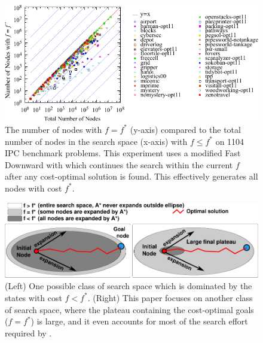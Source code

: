 
\begin{figure}[htbp]
  \centering
  \includegraphics[width=\linewidth]{tables/aaai16-frontier/aaai16prelim3/lmcut_frontier_noh-front.pdf}
 \caption{
 The number of nodes with $f=f^*$ (y-axis) compared to the
 total number of nodes in the search space (x-axis) with $f\leq f^*$ on 1104 IPC benchmark problems.
 This experiment uses a modified Fast Downward with \lmcut which 
 continues the search within the current $f$ after any cost-optimal solution is found.
 This effectively generates all nodes with cost $f^*$.
  }
 \label{fig:plateau-noh}
\end{figure}

\begin{figure}[htbp]
  \centering
  \includegraphics[width=\linewidth]{img/astar/plateau-0.pdf}
 \caption{(Left) One possible class of search space which is dominated by the states with cost $f<f^*$. (Right) This paper focuses on another class of search space, where the plateau containing the cost-optimal goals ($f=f^*$) is large, and it even accounts for most of the search effort required by \astar. %
  }
 \label{fig:plateau-0}
\end{figure}

